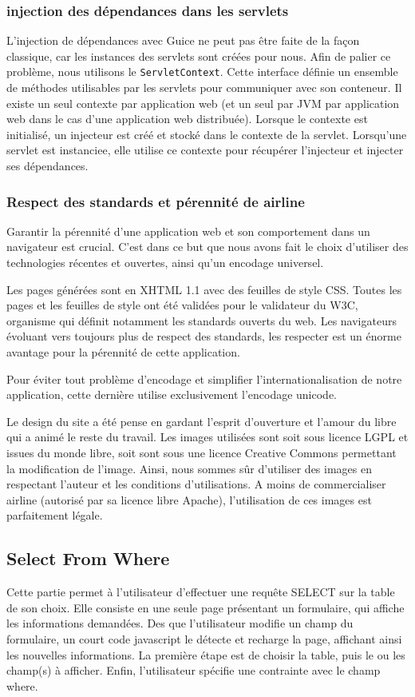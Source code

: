 \subsubsection{injection des dépendances dans les servlets}
L'injection de dépendances avec Guice ne peut pas être faite de la façon classique, car les instances des servlets sont créées pour nous. Afin de palier ce problème, nous utilisons le \verb|ServletContext|. Cette  interface définie un ensemble de méthodes utilisables par les servlets pour communiquer avec son conteneur. Il existe un seul contexte par application web (et un seul par JVM par application web dans le cas d'une application web distribuée). Lorsque le contexte est initialisé, un injecteur est créé et stocké dans le contexte de la servlet. Lorsqu'une servlet est instanciee, elle utilise ce contexte pour récupérer l'injecteur et injecter ses dépendances.

\subsubsection{Respect des standards et pérennité de airline}
Garantir la pérennité d'une application web et son comportement dans un navigateur est crucial. C'est dans ce but que nous avons fait le choix d'utiliser des technologies récentes et ouvertes, ainsi qu'un encodage universel.

Les pages générées sont en XHTML 1.1 avec des feuilles de style CSS. Toutes les pages et les feuilles de style ont été validées pour le validateur du W3C, organisme qui définit notamment les standards ouverts du web. Les navigateurs évoluant vers toujours plus de respect des standards, les respecter est un énorme avantage pour la pérennité de cette application.

Pour éviter tout problème d'encodage et simplifier l'internationalisation de notre application, cette dernière utilise exclusivement l'encodage unicode.

Le design du site a été pense en gardant l'esprit d'ouverture et l'amour du libre qui a animé le reste du travail. Les images utilisées sont soit sous licence LGPL et issues du monde libre, soit sont sous une licence Creative Commons permettant la modification de l'image. Ainsi, nous sommes sûr d'utiliser des images en respectant l'auteur et les conditions d'utilisations. A moins de commercialiser airline (autorisé par sa licence libre Apache), l'utilisation de ces images est parfaitement légale.

\subsection{Select From Where}
Cette partie permet à l'utilisateur d'effectuer une requête SELECT sur la table de son choix. Elle consiste en une seule page présentant un formulaire, qui affiche les informations demandées. Des que l'utilisateur modifie un champ du formulaire, un court code javascript le détecte et recharge la page, affichant ainsi les nouvelles informations. La première étape est de choisir la table, puis le ou les champ(s) à afficher. Enfin, l'utilisateur spécifie une contrainte avec le champ where.

